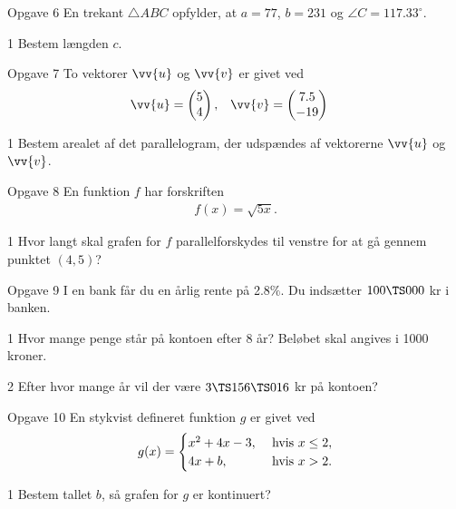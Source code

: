 \begin{opgavetekst}{Opgave 6}
	En trekant $\triangle ABC$ opfylder, at $a = 77$, $b = 231$ og $\angle C = 117.33^\circ$.
\end{opgavetekst}
\begin{delopgave}{1}
	Bestem længden $c$.
\end{delopgave}

\begin{opgavetekst}{Opgave 7}
	To vektorer $\vv{u}$ og $\vv{v}$ er givet ved
	\begin{align*}
		&\vv{u} = 
		\begin{pmatrix}
			5 \\ 4
		\end{pmatrix}, &
		&\vv{v} = 
		\begin{pmatrix}
			7.5 \\
			-19
		\end{pmatrix}
	\end{align*}
\end{opgavetekst}
\begin{delopgave}{1}
	Bestem arealet af det parallelogram, der udspændes af vektorerne $\vv{u}$ og $\vv{v}$. 
\end{delopgave}

\begin{opgavetekst}{Opgave 8}
	En funktion $f$ har forskriften
	\begin{align*}
		f(x) = \sqrt{5x}.
	\end{align*}
\end{opgavetekst}
\begin{delopgave}{1}
	Hvor langt skal grafen for $f$ parallelforskydes til venstre for at gå gennem punktet $(4,5)$? 
\end{delopgave}
%
%
\begin{opgavetekst}{Opgave 9}
	I en bank får du en årlig rente på 2.8$\%$. Du indsætter $100\TS 000$ kr i banken.
\end{opgavetekst}
\begin{delopgave}{1}
	Hvor mange penge står på kontoen efter 8 år? Beløbet skal angives i 1000 kroner. 
\end{delopgave}
\begin{delopgave}{2}
	Efter hvor mange år vil der være $3 \TS 156 \TS 016$ kr på kontoen?
\end{delopgave}
%
%
\begin{opgavetekst}{Opgave 10}
	En stykvist defineret funktion $g$ er givet ved
	\begin{align*}
		g(x) = 
		\begin{cases}
			x^2 + 4x - 3,  &\textnormal{ hvis }x \leq 2,\\
			4x + b,  &\textnormal{ hvis }x > 2.
		\end{cases}
	\end{align*}
\end{opgavetekst}
\begin{delopgave}{1}
	Bestem tallet $b$, så grafen for $g$ er kontinuert? 
\end{delopgave}